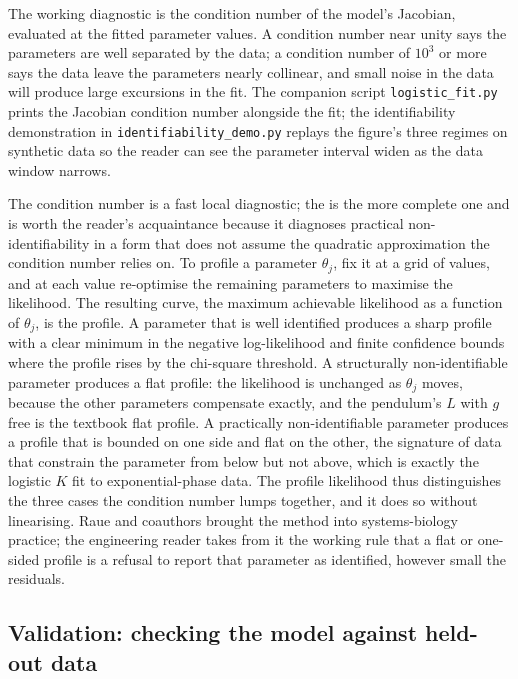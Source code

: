 

The working diagnostic is the condition number of the model's
Jacobian, evaluated at the fitted parameter values. A condition number
near unity says the parameters are well separated by the data; a
condition number of $10^{3}$ or more says the data leave the
parameters nearly collinear, and small noise in the data will produce
large excursions in the fit. The companion script
\texttt{logistic\_fit.py} prints the Jacobian condition number
alongside the fit; the identifiability demonstration in
\texttt{identifiability\_demo.py} replays the figure's three regimes
on synthetic data so the reader can see the parameter interval widen
as the data window narrows.

\begin{mastery}
The condition number is a fast local diagnostic; the
 is the more complete one and is worth the
reader's acquaintance because it diagnoses practical non-identifiability
in a form that does not assume the quadratic approximation the
condition number relies on. To profile a parameter $\theta_j$, fix it at
a grid of values, and at each value re-optimise the remaining
parameters to maximise the likelihood. The resulting curve, the maximum
achievable likelihood as a function of $\theta_j$, is the profile. A
parameter that is well identified produces a sharp profile with a clear
minimum in the negative log-likelihood and finite confidence bounds
where the profile rises by the chi-square threshold. A structurally
non-identifiable parameter produces a flat profile: the likelihood is
unchanged as $\theta_j$ moves, because the other parameters compensate
exactly, and the pendulum's $L$ with $g$ free is the textbook flat
profile. A practically non-identifiable parameter produces a profile
that is bounded on one side and flat on the other, the signature of data
that constrain the parameter from below but not above, which is exactly
the logistic $K$ fit to exponential-phase data. The profile likelihood
thus distinguishes the three cases the condition number lumps together,
and it does so without linearising. Raue and coauthors brought the
method into systems-biology practice; the engineering reader takes from
it the working rule that a flat or one-sided profile is a refusal to
report that parameter as identified, however small the residuals.
\end{mastery}

\subsection{Validation: checking the model against held-out data}

